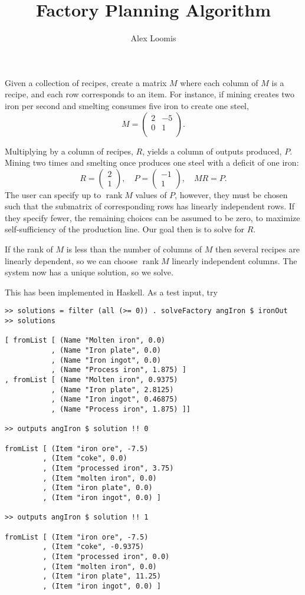 \documentclass[12pt]{article}
\title{Factory Planning Algorithm}
\author{Alex Loomis}
\DeclareMathOperator\rank{rank}
\begin{document}
\maketitle

Given a collection of recipes,
create a matrix $M$ where each column of $M$ is a recipe,
and each row corresponds to an item.
For instance, if mining creates two iron per second
and smelting consumes five iron to create one steel,
\[
  M = \begin{pmatrix}
    2 & -5 \\
    0 & 1 \\
  \end{pmatrix}.
\]

Multiplying by a column of recipes, $R$,
yields a column of outputs produced, $P$.
Mining two times and smelting once produces
one steel with a deficit of one iron:
\[
  R = \begin{pmatrix} 2 \\ 1 \end{pmatrix}, \quad
  P = \begin{pmatrix} -1 \\ 1 \end{pmatrix}, \quad
  MR = P.
\]
The user can specify up to $\rank M$ values of $P$, however,
they must be chosen such that the submatrix of corresponding rows
has linearly independent rows.
If they specify fewer, the remaining choices can be assumed to be zero,
to maximize self-sufficiency of the production line.
Our goal then is to solve for $R$.

If the rank of $M$ is less than the number of columns of $M$
then several recipes are linearly dependent,
so we can choose $\rank M$ linearly independent columns.
The system now has a unique solution, so we solve.

This has been implemented in Haskell.
As a test input, try
\begin{verbatim}
>> solutions = filter (all (>= 0)) . solveFactory angIron $ ironOut
>> solutions

[ fromList [ (Name "Molten iron", 0.0)
           , (Name "Iron plate", 0.0)
           , (Name "Iron ingot", 0.0)
           , (Name "Process iron", 1.875) ]
, fromList [ (Name "Molten iron", 0.9375)
           , (Name "Iron plate", 2.8125)
           , (Name "Iron ingot", 0.46875)
           , (Name "Process iron", 1.875) ]]

>> outputs angIron $ solution !! 0

fromList [ (Item "iron ore", -7.5)
         , (Item "coke", 0.0)
         , (Item "processed iron", 3.75)
         , (Item "molten iron", 0.0)
         , (Item "iron plate", 0.0)
         , (Item "iron ingot", 0.0) ]

>> outputs angIron $ solution !! 1

fromList [ (Item "iron ore", -7.5)
         , (Item "coke", -0.9375)
         , (Item "processed iron", 0.0)
         , (Item "molten iron", 0.0)
         , (Item "iron plate", 11.25)
         , (Item "iron ingot", 0.0) ]
\end{verbatim}
\end{document}
